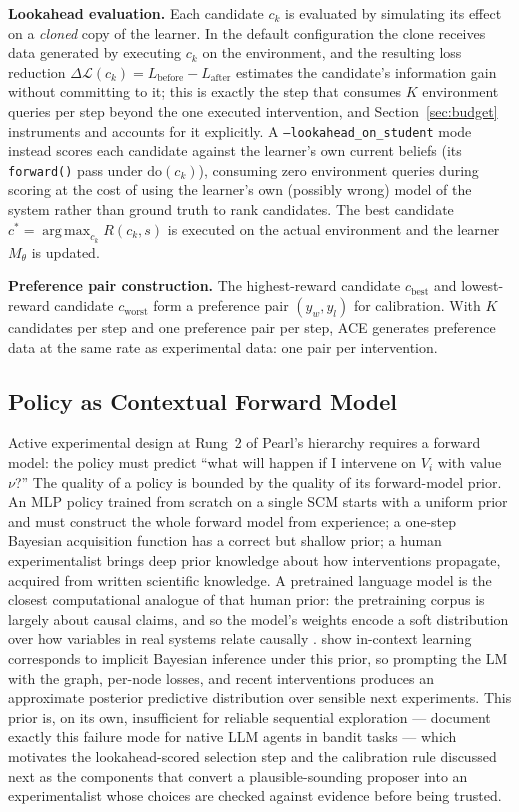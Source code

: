 \documentclass{article}
\DeclareMathOperator*{\argmax}{arg\,max}
\theoremstyle{plain}
\theoremstyle{definition}
\theoremstyle{remark}
\begin{document}
\textbf{Lookahead evaluation.} Each candidate $c_k$ is evaluated by simulating its effect on a \emph{cloned} copy of the learner. In the default configuration the clone receives data generated by executing $c_k$ on the environment, and the resulting loss reduction $\Delta\mathcal{L}(c_k) = L_\text{before} - L_\text{after}$ estimates the candidate's information gain without committing to it; this is exactly the step that consumes $K$ environment queries per step beyond the one executed intervention, and Section~\ref{sec:budget} instruments and accounts for it explicitly. A \texttt{--lookahead\_on\_student} mode instead scores each candidate against the learner's own current beliefs (its \texttt{forward()} pass under $\text{do}(c_k)$), consuming zero environment queries during scoring at the cost of using the learner's own (possibly wrong) model of the system rather than ground truth to rank candidates. The best candidate $c^* = \argmax_{c_k} R(c_k, s)$ is executed on the actual environment and the learner $M_\theta$ is updated.

\textbf{Preference pair construction.} The highest-reward candidate $c_\text{best}$ and lowest-reward candidate $c_\text{worst}$ form a preference pair $(y_w, y_l)$ for calibration. With $K$ candidates per step and one preference pair per step, ACE generates preference data at the same rate as experimental data: one pair per intervention.

\subsection{Policy as Contextual Forward Model}
\label{sec:lm-policy}

Active experimental design at Rung~2 of Pearl's hierarchy requires a forward model: the policy must predict ``what will happen if I intervene on $V_i$ with value $\nu$?'' The quality of a policy is bounded by the quality of its forward-model prior. An MLP policy trained from scratch on a single SCM starts with a uniform prior and must construct the whole forward model from experience; a one-step Bayesian acquisition function has a correct but shallow prior; a human experimentalist brings deep prior knowledge about how interventions propagate, acquired from written scientific knowledge. A pretrained language model is the closest computational analogue of that human prior: the pretraining corpus is largely about causal claims, and so the model's weights encode a soft distribution over how variables in real systems relate causally \citep{hao2023reasoning,kiciman2023causal}. \citet{xie2022explanation} show in-context learning corresponds to implicit Bayesian inference under this prior, so prompting the LM with the graph, per-node losses, and recent interventions produces an approximate posterior predictive distribution over sensible next experiments. This prior is, on its own, insufficient for reliable sequential exploration --- \citet{krishnamurthy2024explore} document exactly this failure mode for native LLM agents in bandit tasks --- which motivates the lookahead-scored selection step and the calibration rule discussed next as the components that convert a plausible-sounding proposer into an experimentalist whose choices are checked against evidence before being trusted.
\end{document}
